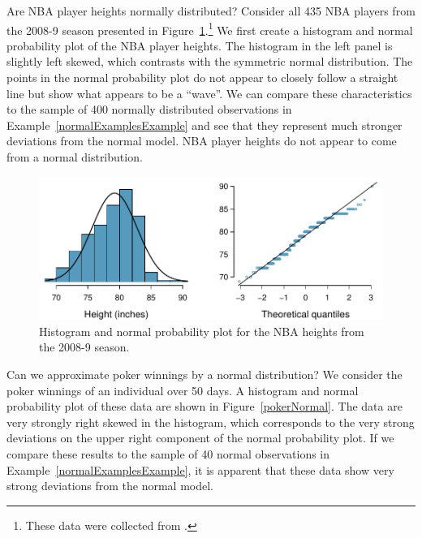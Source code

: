 \begin{example}{Are NBA player heights normally distributed? Consider all 435 NBA players from the 2008-9 season presented in Figure~\ref{nbaNormal}.\footnote{These data were collected from .}}
We first create a histogram and normal probability plot of the NBA player heights. The histogram in the left panel is slightly left skewed, which contrasts with the symmetric normal distribution. The points in the normal probability plot do not appear to closely follow a straight line but show what appears to be a ``wave''. We can compare these characteristics to the sample of 400 normally distributed observations in Example~\ref{normalExamplesExample} and see that they represent much stronger deviations from the normal model. NBA player heights do not appear to come from a normal distribution.
\end{example}

\begin{figure}[H]
\centering
\includegraphics[width=\textwidth]{03/figures/nbaNormal/nbaNormal}
\caption{Histogram and normal probability plot for the NBA heights from the 2008-9 season.}
\label{nbaNormal}
\end{figure}


\begin{example}{Can we approximate poker winnings by a normal distribution? We consider the poker winnings of an individual over 50 days. A histogram and normal probability plot of these data are shown in Figure~\ref{pokerNormal}.}
The data are very strongly right skewed in the histogram, which corresponds to the very strong deviations on the upper right component of the normal probability plot. If we compare these results to the sample of 40 normal observations in Example~\ref{normalExamplesExample}, it is apparent that these data show very strong deviations from the normal model.
\end{example}

